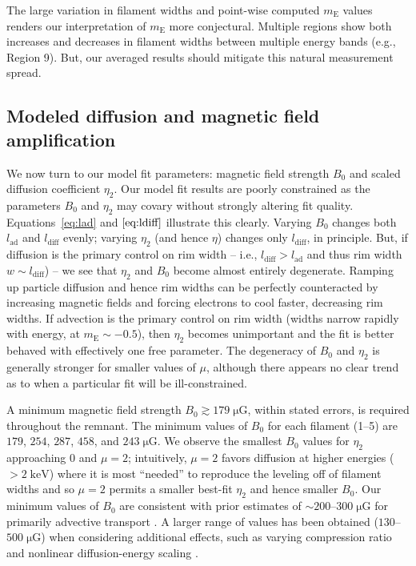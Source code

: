 \documentclass[iop, apj, numberedappendix, twocolappendix]{emulateapj}
\newcommand*{\mt}{\mathrm}
\newcommand*{\unit}[1]{\;\mt{#1}}  %
\newcommand*{\abt}{\mathord{\sim}} %
\newcommand*{\mE}{m_\mt{E}}
\newcommand*{\muG}{\unit{\mu G}}
\begin{document}
The large variation in filament widths and point-wise computed $\mE$ values
renders our interpretation of $\mE$ more conjectural.  Multiple regions show both
increases and decreases in filament widths between multiple energy bands (e.g.,
Region 9).  But, our averaged results should mitigate this natural measurement
spread.

\subsection{Modeled diffusion and magnetic field amplification}

We now turn to our model fit parameters: magnetic field strength $B_0$ and
scaled diffusion coefficient $\eta_2$.  Our model fit results are poorly
constrained as the parameters $B_0$ and $\eta_2$ may covary without strongly
altering fit quality.  Equations~\eqref{eq:lad} and $\eqref{eq:ldiff}$
illustrate this clearly.  Varying $B_0$ changes both $l_{\mt{ad}}$ and
$l_{\mt{diff}}$ evenly; varying $\eta_2$ (and hence $\eta$) changes only
$l_{\mt{diff}}$, in principle.  But, if diffusion is the primary control on rim
width -- i.e., $l_{\mt{diff}} > l_{\mt{ad}}$ and thus rim width $w \sim
l_{\mt{diff}}$) -- we see that $\eta_2$ and $B_0$ become almost entirely
degenerate.  Ramping up particle diffusion and hence rim widths can be
perfectly counteracted by increasing magnetic fields and forcing electrons to
cool faster, decreasing rim widths.  If advection is the primary control on rim
width (widths narrow rapidly with energy, at $\mE \sim -0.5$), then $\eta_2$
becomes unimportant and the fit is better behaved with effectively one free
parameter.  The degeneracy of $B_0$ and $\eta_2$ is generally stronger for
smaller values of $\mu$, although there appears no clear trend as to when a
particular fit will be ill-constrained.

A minimum magnetic field strength $B_0 \gtrsim 179 \muG$, within stated
errors, is required throughout the remnant.  The minimum values of $B_0$ for
each filament (1--5) are $179$, $254$, $287$, $458$, and $243 \muG$.
We observe the smallest $B_0$ values for $\eta_2$ approaching $0$ and $\mu =
2$; intuitively, $\mu = 2$ favors diffusion at higher energies ($>2\unit{keV}$)
where it is most ``needed'' to reproduce the leveling off of filament widths
and so $\mu = 2$ permits a smaller best-fit $\eta_2$ and hence smaller $B_0$.
Our minimum values of $B_0$ are consistent with prior estimates of
$\abt 200$--$300 \muG$ for primarily advective transport
\citep{volk2005, parizot2006, morlino2012} .  A larger range of values has been
obtained ($130$--$500 \muG$) when considering additional effects, such as
varying compression ratio and nonlinear diffusion-energy scaling
\citep{parizot2006, cassam-chenai2007}.
\end{document}
